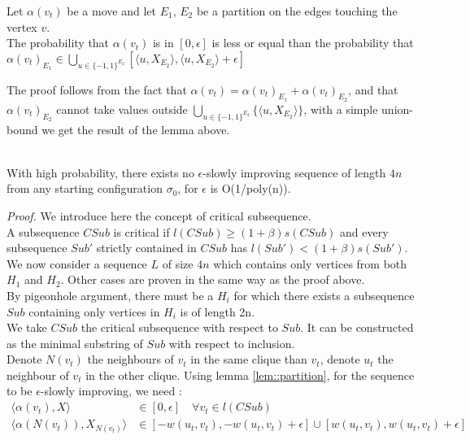 \begin{lemma}
\label{lem::partition}
Let $\alpha(v_t)$ be a move and let $E_1$, $E_2$ be a partition on the edges touching the vertex $v$. \\
The probability that $\alpha(v_t)$ is in $[0, \epsilon]$ is less or equal than the probability that $\alpha(v_t)_{E_1} \in \bigcup_{u \in \{-1, 1 \}^{E_2}} [\langle u, X_{E_2}\rangle , \langle u, X_{E_2}\rangle + \epsilon]$
\end{lemma}

The proof follows from the fact that $\alpha(v_t) = \alpha(v_t)_{E_1} + \alpha(v_t)_{E_2}$, and that $\alpha(v_t)_{E_2}$ cannot take values outside $\bigcup_{u \in \{-1, 1 \}^{E_2}}\{\langle u, X_{E_2}\rangle\}$, with a simple union-bound we get the result of the lemma above.\\

\begin{proposition}
\leavevmode \\
With high probability, there exists no $\epsilon$-slowly improving sequence of length $4n$ from any starting configuration $\sigma_0$, for $\epsilon$ is O(1/poly(n)).
\end{proposition}

\textit{Proof. }
We introduce here the concept of critical subsequence. \\
A subsequence $CSub$ is critical if $l(CSub) \geq (1 + \beta)s(CSub)$ and every subsequence $Sub'$ strictly contained in $CSub$ has $l(Sub') < (1+\beta)s(Sub')$. \\
We now consider a sequence $L$ of size $4n$ which contains only vertices from both $H_1$ and $H_2$. 
Other cases are proven in the same way as the proof above. \\
By pigeonhole argument, there must be a $H_i$ for which there exists a subsequence $Sub$ containing only vertices in $H_i$ is of length 2n. \\
We take $CSub$ the critical subsequence with respect to $Sub$. It can be constructed as the minimal substring of $Sub$ with respect to inclusion.\\
Denote $N(v_t)$ the neighbours of $v_t$ in the same clique than $v_t$, denote $u_t$ the neighbour of $v_t$ in the other clique.
Using lemma \ref{lem::partition}, for the sequence to be $\epsilon$-slowly improving, we need :
\begin{equation*}
\begin{split}
\langle \alpha(v_t), X \rangle &\in [0, \epsilon] \quad \forall v_t \in l(CSub) \\
\langle \alpha(N(v_t)), X_{N(v_t)}\rangle &\in [-w(u_t,v_t), -w(u_t,v_t) + \epsilon] \cup [w(u_t,v_t), w(u_t,v_t) + \epsilon]
\end{split}
\end{equation*}

